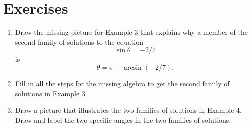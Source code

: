 \documentclass{ximera}
\begin{document}
\section{Exercises}

\begin{exercise} \label{Exe8310}
\begin{enumerate}
\item Draw the missing picture for Example 3 that explains why a member of the second family of solutions to the equation
\[
   \sin\theta = -2/7
\]
is
\[
 \theta = \pi - \arcsin(-2/7).
\]

\item Fill in all the steps for the missing algebra to get the second family of solutions in Example 3.

\item Draw a picture that illustrates the two families of solutions in Example 4. Draw and label the two specific angles in the two families of solutions.

\end{enumerate}
\end{exercise}
\end{document}
